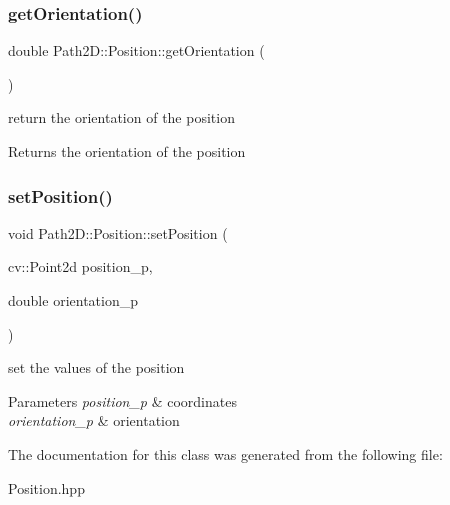 \subsubsection{\texorpdfstring{get\+Orientation()}{getOrientation()}}
{\footnotesize\ttfamily double Path2\+D\+::\+Position\+::get\+Orientation (\begin{DoxyParamCaption}{ }\end{DoxyParamCaption})}



return the orientation of the position 

\begin{DoxyReturn}{Returns}
the orientation of the position 
\end{DoxyReturn}
\mbox{\label{class_path2_d_1_1_position_aaf9197b7320cde418bfcd0c0e149cd26}} 
\subsubsection{\texorpdfstring{set\+Position()}{setPosition()}}
{\footnotesize\ttfamily void Path2\+D\+::\+Position\+::set\+Position (\begin{DoxyParamCaption}\item[{cv\+::\+Point2d}]{position\+\_\+p,  }\item[{double}]{orientation\+\_\+p }\end{DoxyParamCaption})}



set the values of the position 


\begin{DoxyParams}{Parameters}
{\em position\+\_\+p} & coordinates \\
\hline
{\em orientation\+\_\+p} & orientation \\
\hline
\end{DoxyParams}


The documentation for this class was generated from the following file\+:\begin{DoxyCompactItemize}
\item 
Position.\+hpp\end{DoxyCompactItemize}
